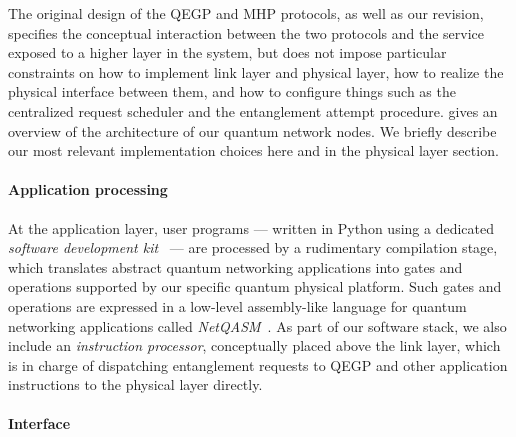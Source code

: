 The original design of the QEGP and MHP protocols, as well as our revision, specifies the conceptual
interaction between the two protocols and the service exposed to a higher layer in the system, but
does not impose particular constraints on how to implement link layer and physical layer, how to
realize the physical interface between them, and how to configure things such as the centralized
request scheduler and the entanglement attempt procedure.  gives an overview of
the architecture of our quantum network nodes. We briefly describe our most relevant implementation
choices here and in the physical layer section.

\paragraph{Application processing}

At the application layer, user programs --- written in Python using a dedicated \emph{software
development kit}~\cite{netqasm_sdk} --- are processed by a rudimentary compilation stage, which
translates abstract quantum networking applications into gates and operations supported by our
specific quantum physical platform. Such gates and operations are expressed in a low-level
assembly-like language for quantum networking applications called
\emph{NetQASM}~\cite{dahlberg_2022_netqasm}. As part of our software stack, we also include an
\emph{instruction processor}, conceptually placed above the link layer, which is in charge of
dispatching entanglement requests to QEGP and other application instructions to the physical layer
directly.

\paragraph{Interface}

